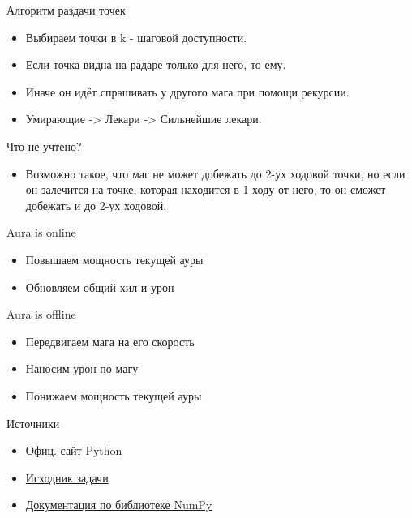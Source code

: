 \begin{frame}{Алгоритм раздачи точек}
\begin{itemize}
    \item Выбираем точки в k - шаговой доступности.
    \item Если точка видна на радаре только для него, то ему.
    \item Иначе он идёт спрашивать у другого мага при помощи рекурсии.
    \item Умирающие -> Лекари -> Сильнейшие лекари.
\end{itemize}
\end{frame}

\begin{frame}{Что не учтено?}
\begin{itemize}
    \item Возможно такое, что маг не может добежать до 2-ух ходовой точки, но если он залечится на точке, которая находится в 1 ходу от него, то он сможет добежать и до 2-ух ходовой.
\end{itemize}
\end{frame}

\begin{frame}{Aura is online}
\begin{itemize}
    \item Повышаем мощность текущей ауры
    \item Обновляем общий хил и урон
\end{itemize}
\end{frame}

\begin{frame}{Aura is offline}
\begin{itemize}
    \item Передвигаем мага на его скорость
    \item Наносим урон по магу
    \item Понижаем мощность текущей ауры
\end{itemize}
\end{frame}

\begin{frame}{Источники}
\begin{itemize}
    \item \href{www.python.org}{Офиц. сайт Python}
    \item \href{https://acm.timus.ru/problem.aspx?space=1&num=1952}{Исходник задачи}
    \item \href{https://numpy.org/doc/}{Документация по библиотеке NumPy}
\end{itemize}
\end{frame}
